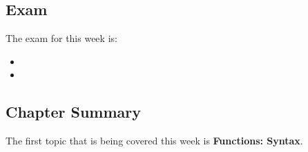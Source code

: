 \subsection{Exam}

The exam for this week is:

\begin{itemize}
    \item {}
    \item {}
\end{itemize}

\newpage

\subsection{Chapter Summary}

The first topic that is being covered this week is \textbf{Functions: Syntax}.


